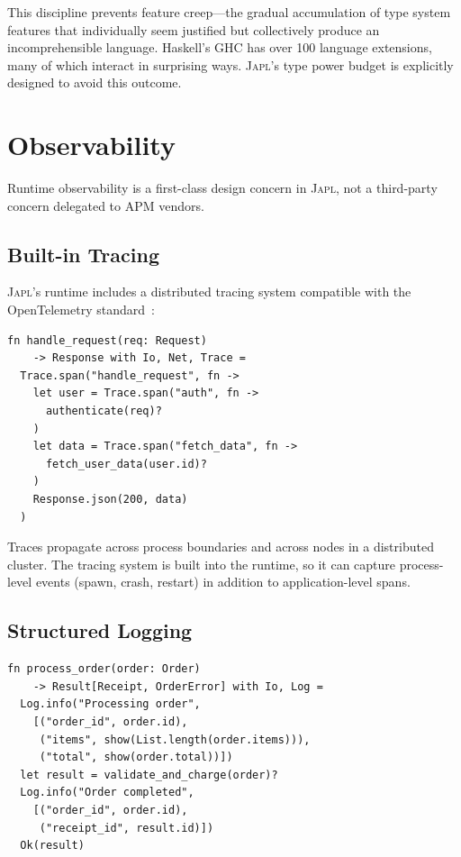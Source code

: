 \documentclass[11pt,twocolumn]{article}
\newcommand{\japl}{\textsc{Japl}}
\begin{document}
This discipline prevents feature creep---the gradual accumulation of type system features that individually seem justified but collectively produce an incomprehensible language.
Haskell's GHC has over 100 language extensions, many of which interact in surprising ways.
\japl{}'s type power budget is explicitly designed to avoid this outcome.

\section{Observability}
\label{sec:observability}

Runtime observability is a first-class design concern in \japl{}, not a third-party concern delegated to APM vendors.

\subsection{Built-in Tracing}

\japl{}'s runtime includes a distributed tracing system compatible with the OpenTelemetry standard~\citep{opentelemetry2023}:

\begin{lstlisting}
fn handle_request(req: Request)
    -> Response with Io, Net, Trace =
  Trace.span("handle_request", fn ->
    let user = Trace.span("auth", fn ->
      authenticate(req)?
    )
    let data = Trace.span("fetch_data", fn ->
      fetch_user_data(user.id)?
    )
    Response.json(200, data)
  )
\end{lstlisting}

Traces propagate across process boundaries and across nodes in a distributed cluster.
The tracing system is built into the runtime, so it can capture process-level events (spawn, crash, restart) in addition to application-level spans.

\subsection{Structured Logging}

\begin{lstlisting}
fn process_order(order: Order)
    -> Result[Receipt, OrderError] with Io, Log =
  Log.info("Processing order",
    [("order_id", order.id),
     ("items", show(List.length(order.items))),
     ("total", show(order.total))])
  let result = validate_and_charge(order)?
  Log.info("Order completed",
    [("order_id", order.id),
     ("receipt_id", result.id)])
  Ok(result)
\end{lstlisting}
\end{document}
